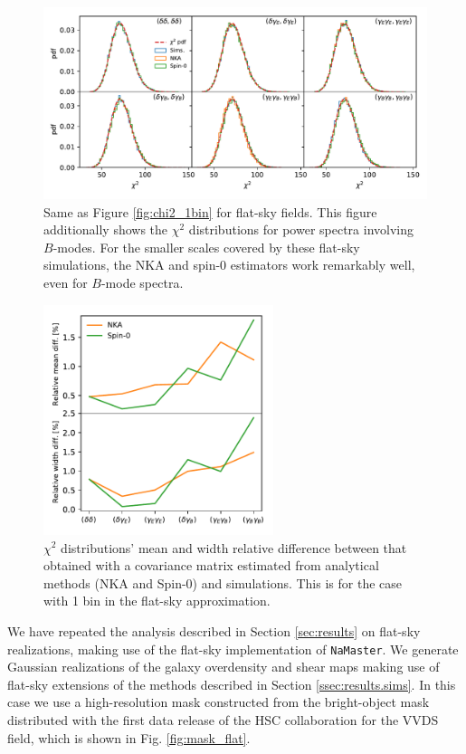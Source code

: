 \documentclass[a4paper,11pt]{article}
\begin{document}
    \begin{figure}
      \centering
      \includegraphics[width=\textwidth]{./figures/run_chi2_TT_TE_EE_TB_EB_BB.pdf}
      \caption{Same as Figure \ref{fig:chi2_1bin} for flat-sky fields. This figure additionally shows the $\chi^2$ distributions for power spectra involving $B$-modes. For the smaller scales covered by these flat-sky simulations, the NKA and spin-0 estimators work remarkably well, even for $B$-mode spectra.}
      \label{fig:chi2_1bin_flat}
    \end{figure}
      \begin{figure}
        \centering
        \includegraphics[width=0.6\textwidth]{./figures/run_chi2_mean_cov_diff.pdf}
        \caption{$\chi^2$ distributions' mean and width relative difference
          between that obtained with a covariance matrix estimated from
          analytical methods (NKA and Spin-0) and simulations. This is for the
          case with 1 bin in the flat-sky approximation.}
        \label{fig:chi2_1bin_flat_diffs}
      \end{figure}
    We have repeated the analysis described in Section \ref{sec:results} on flat-sky realizations, making use of the flat-sky implementation of {\tt NaMaster}. We generate Gaussian realizations of the galaxy overdensity and shear maps making use of flat-sky extensions of the methods described in Section \ref{ssec:results.sims}. In this case we use a high-resolution mask constructed from the bright-object mask distributed with the first data release of the HSC collaboration \cite{2018PASJ...70S...4A} for the VVDS field, which is shown in Fig. \ref{fig:mask_flat}. 
    
\end{document}
